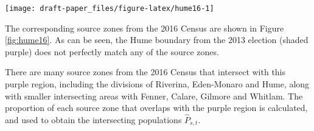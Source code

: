 \documentclass[11pt,a4paper,]{article}
\let\origfigure\figure
\let\endorigfigure\endfigure
\renewenvironment{figure}[1][2] {
    \expandafter\origfigure\expandafter[htbp]
} {
    \endorigfigure
}
\let\origtable\table
\let\endorigtable\endtable
\renewenvironment{table}[1][2] {
    \expandafter\origtable\expandafter[htbp]
} {
    \endorigtable
}
\begin{document}
\begin{figure}[h]

{\centering \texttt{[image: draft-paper\_files/figure-latex/hume16-1]} 

}

\caption{Census division boundaries in NSW for 2016, with the 2013 electoral boundary for Hume, shown in purple. The purple region is not contained within a single Census division.}\label{fig:hume16}
\end{figure}

The corresponding source zones from the 2016 Census are shown in Figure \ref{fig:hume16}. As can be seen, the Hume boundary from the 2013 election (shaded purple) does not perfectly match any of the source zones.

There are many source zones from the 2016 Census that intersect with this purple region, including the divisions of Riverina, Eden-Monaro and Hume, along with smaller intersecting areas with Fenner, Calare, Gilmore and Whitlam. The proportion of each source zone that overlaps with the purple region is calculated, and used to obtain the intersecting populations \(\hat{P}_{s,t}\).

\begin{table}[H]
\centering\begingroup\fontsize{10}{12}\selectfont

\endgroup{}
\end{table}
\end{document}
